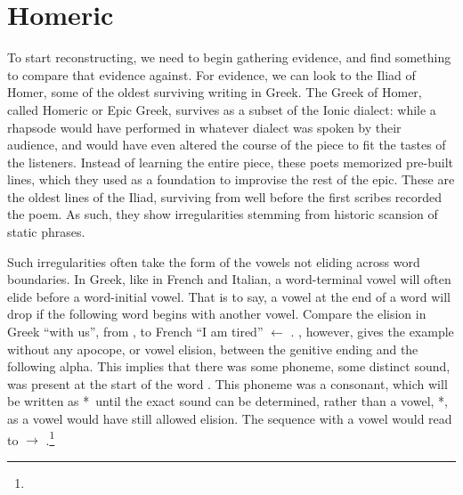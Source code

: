 \section{Homeric}\label{sec:Homeric}

To start reconstructing, we need to begin gathering evidence, and find something to compare that evidence against. For evidence, we can look to the Iliad of Homer, some of the oldest surviving writing in Greek. The Greek of Homer, called Homeric or Epic Greek, survives as a subset of the Ionic dialect: while a rhapsode would have performed in whatever dialect was spoken by their audience, and would have even altered the course of the piece to fit the tastes of the listeners. Instead of learning the entire piece, these poets memorized pre-built lines, which they used as a foundation to improvise the rest of the epic. These are the oldest lines of the Iliad, surviving from well before the first scribes recorded the poem. As such, they show irregularities stemming from historic scansion of static phrases.

Such irregularities often take the form of the vowels not eliding across word boundaries. In Greek, like in French and Italian, a word-terminal vowel will often elide before a word-initial vowel. That is to say, a vowel at the end of a word will drop if the following word begins with another vowel. Compare the elision in Greek   ``with us'', from , to French   ``I am tired'' $\gets$ . , however, gives the example  without any apocope, or vowel elision, between the genitive ending  and the following alpha.\autocite[XV.214]{Iliad_1999} This implies that there was some phoneme, some distinct sound, was present at the start of the word . This phoneme was a consonant, which will be written as *\w\ until the exact sound can be determined, rather than a vowel, *\vowel, as a vowel would have still allowed elision. The sequence with a vowel would read  to  $\to$ .\footnote{}

